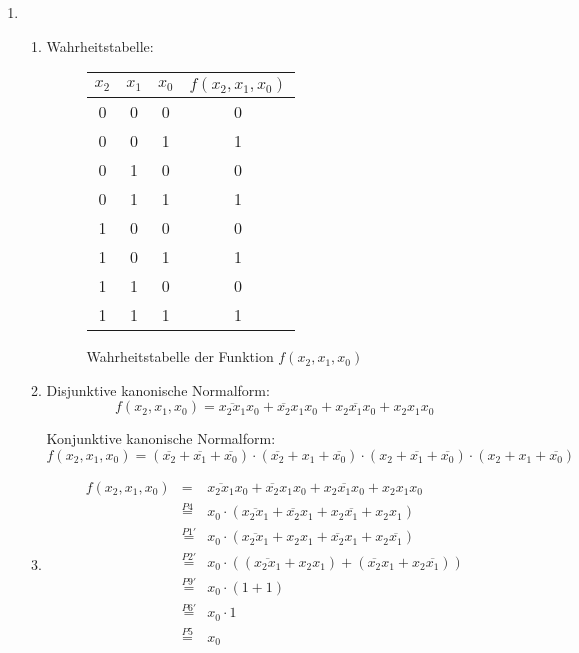 \documentclass[a4paper]{article}
\begin{document}
\begin{enumerate}[label=\alph*)]
	\item 
	\begin{enumerate}[label=\roman*)]
		\item Wahrheitstabelle:
		\begin{figure}[h!]
			\centering
			\begin{tabular}{|c|c|c|c|}
				\hline
				$x_2$ & $x_1$ & $x_0$ & $f(x_2, x_1, x_0)$ \\
				\hline
				0 & 0 & 0 & 0 \\
				0 & 0 & 1 & 1 \\
				0 & 1 & 0 & 0 \\
				0 & 1 & 1 & 1 \\
				1 & 0 & 0 & 0 \\
				1 & 0 & 1 & 1 \\
				1 & 1 & 0 & 0 \\
				1 & 1 & 1 & 1 \\
				\hline
			\end{tabular}
		\caption{Wahrheitstabelle der Funktion $f(x_2, x_1, x_0)$}
		\end{figure}
	
		\item 
		Disjunktive kanonische Normalform:\\ 
		\begin{equation}
			f(x_2, x_1, x_0) = \overline{x_2x_1}x_0 + \overline{x_2}x_1x_0 + x_2\overline{x_1}x_0 + x_2x_1x_0
		\end{equation}
		
		Konjunktive kanonische Normalform: \\
		\begin{equation}
			f(x_2, x_1, x_0) = (\overline{x_2} + \overline{x_1} + \overline{x_0}) \cdot (\overline{x_2} + x_1 + \overline{x_0}) \cdot (x_2 + \overline{x_1} + \overline{x_0}) \cdot (x_2 + x_1 + \overline{x_0})
		\end{equation}
		
		\item 
		\begin{equation}
		\begin{aligned}
			f(x_2, x_1, x_0) &= & \overline{x_2x_1}x_0 + \overline{x_2}x_1x_0 + x_2\overline{x_1}x_0 + x_2x_1x_0 \\
			&\stackrel{P4}{=} & x_0 \cdot (\overline{x_2x_1} + \overline{x_2}x_1 + x_2\overline{x_1} + x_2x_1) \\
			&\stackrel{P1'}{=} & x_0 \cdot (\overline{x_2x_1} + x_2x_1 + \overline{x_2}x_1 + x_2\overline{x_1}) \\
			&\stackrel{P2'}{=} & x_0 \cdot ((\overline{x_2x_1} + x_2x_1) + ( \overline{x_2}x_1 + x_2\overline{x_1})) \\
			&\stackrel{P9'}{=} & x_0 \cdot (1 + 1) \\
			&\stackrel{P6'}{=} & x_0 \cdot 1 \\
			&\stackrel{P5}{=} & x_0 \\
		\end{aligned}
		\end{equation}
	\end{enumerate}


\end{enumerate}
\end{document}
